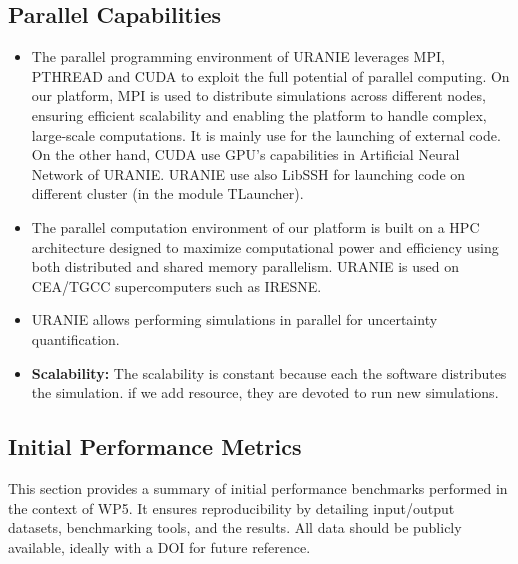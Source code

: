 \subsection{Parallel Capabilities}
\label{sec:WP5:Uranie:performances}


\begin{itemize}
    \item The parallel programming environment of URANIE leverages MPI, PTHREAD
    and CUDA to exploit the full potential of parallel computing. 
    On our platform, MPI is used to distribute simulations across different nodes,
    ensuring efficient scalability and enabling the platform to handle complex, large-scale computations. It is mainly use for the launching of external code.
    On the other hand, CUDA use GPU's capabilities in Artificial Neural Network of URANIE.
    URANIE use also LibSSH for launching code on different cluster (in the module TLauncher).

    \item The parallel computation environment of our platform is built on a HPC architecture designed to maximize computational power and efficiency
    using both distributed and shared memory parallelism. URANIE is used on CEA/TGCC supercomputers such as IRESNE.

    \item URANIE allows performing simulations in parallel for uncertainty quantification.
    \item \textbf{Scalability:} The scalability is constant because each the software distributes the simulation. if we add resource, they are devoted to run new simulations.
\end{itemize}


\subsection{Initial Performance Metrics}
\label{sec:WP5:Uranie:metrics}

This section provides a summary of initial performance benchmarks performed in the context of WP5. It ensures reproducibility by detailing input/output datasets, benchmarking tools, and the results. All data should be publicly available, ideally with a DOI for future reference.

